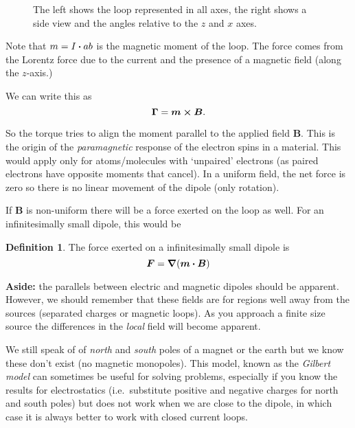 \documentclass[12pt,chapterprefix=false,dvipsnames]{scrbook}
\theoremstyle{dotless}
\theoremstyle{definition}
\newtheorem{protodefinition}{Definition}[section]
\newenvironment{definition}
{\colorlet{shadecolor}{black!15}\begin{shaded}\begin{protodefinition}}
			{\end{protodefinition}\end{shaded}}
\begin{document}
\begin{figure}[htpb]
	\centering
	
	\caption{The left shows the loop represented in all
		axes, the right shows a side view and the angles relative to the
		$z$ and $x$ axes.}%
	\label{fig:torque_magnetic}
\end{figure}

Note that $m = I\vdot ab$ is the magnetic moment of the
loop. The force comes from the Lorentz force due to the current
and the presence of a magnetic field (along the
$z$-axis.)

We can write this as
\begin{equation}
	\label{eq:magnetic_torque}
	\bm{\Gamma} =
	\bm{m}\cross\bm{B}.
\end{equation}

So the torque tries to align the moment parallel to the applied
field $\bm{B}$. This is the origin of the
\textit{paramagnetic} response of the electron spins in a
material. This would apply only for atoms/molecules with
`unpaired' electrons (as paired electrons have opposite moments
that cancel). In a uniform field, the net force is zero so there
is no linear movement of the dipole (only rotation).

If $\bm{B}$ is non-uniform there will be a force
exerted on the loop as well. For an infinitesimally small
dipole, this would be
\begin{definition}
	The force exerted on a infinitesimally small dipole is
	\begin{equation}
		\bm{F} = \gradient(\bm{m}\vdot\bm{B})
	\end{equation}
\end{definition}

\textbf{Aside:} the parallels between electric and
magnetic dipoles should be apparent. However, we should remember
that these fields are for regions well away from the sources
(separated charges or magnetic loops). As you approach a finite
size source the differences in the \textit{local}
field will become apparent.

We still speak of of \textit{north} and
\textit{south} poles of a magnet or the earth but we
know these don't exist (no magnetic monopoles). This model,
known as the \textit{Gilbert model} can sometimes be useful
for solving problems, especially if you know the results for
electrostatics (i.e.\ substitute positive and negative charges
for north and south poles) but does not work when we are close
to the dipole, in which case it is always better to work with
closed current loops.
\end{document}
